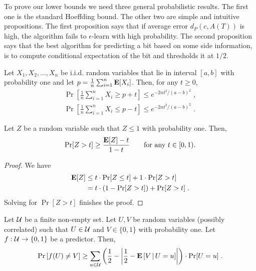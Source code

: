 To prove our lower bounds we need three general probabilistic results. The first
one is the standard Hoeffding bound. The other two are simple and intuitive
propositions. The first proposition says that if average error $d_P(c,A(T))$ is
high, the algorithm fails to $\epsilon$-learn with high probability. The second
proposition says that the best algorithm for predicting a bit based on some side
information, is to compute conditional expectation of the bit and thresholds it
at $1/2$.

\begin{theorem}
Let $X_1, X_2, \dots, X_n$ be i.i.d. random variables that lie in interval
$[a,b]$ with probability one and let $p=\frac{1}{n}\sum_{i=1}^n \operatorname{\mathbf{E}}[X_i]$.
Then, for any $t \ge 0$,
\begin{align*}
\Pr \left[{\frac {1}{n}} \sum_{i=1}^n X_i \ge p + t \right] \le e^{ - 2n t^2/(a-b)^2} \; , \\
\Pr \left[{\frac {1}{n}} \sum_{i=1}^n X_i \le p - t \right] \le e^{ - 2n t^2/(a-b)^2}  \; .
\end{align*}
\end{theorem}

\begin{proposition}
\label{proposition:error-probability-vs-expected-error}
Let $Z$ be a random variable such that $Z \le 1$ with probability one.
Then,
$$
\Pr[Z > t] \ge \frac{\operatorname{\mathbf{E}}[Z] - t}{1 - t} \qquad \text{for any $t \in [0, 1)$.}
$$
\end{proposition}

\begin{proof}
We have
\begin{align*}
\operatorname{\mathbf{E}}[Z]
& \le t \cdot \Pr[Z \le t] + 1 \cdot \Pr[Z > t] \\
& = t \cdot (1 - \Pr[Z > t]) + \Pr[Z > t] \; .
\end{align*}
Solving for $\Pr[Z > t]$ finishes the proof.
\end{proof}

\begin{proposition}
\label{proposition:single-bit}
Let $\mathcal{U}$ be a finite non-empty set. Let $U,V$ be random variables (possibly
correlated) such that $U \in \mathcal{U}$ and $V \in \{0,1\}$ with probability one. Let
$f:\mathcal{U} \to \{0,1\}$ be a predictor. Then,
$$
\Pr\left[ f(U) \neq V \right]
\ge \sum_{u \in \mathcal{U}} \left( \frac{1}{2} - \left| \frac{1}{2} -  \operatorname{\mathbf{E}} \left[V \, \middle| \, U = u\right] \right| \right) \cdot \Pr[U = u] \; .
$$
\end{proposition}

